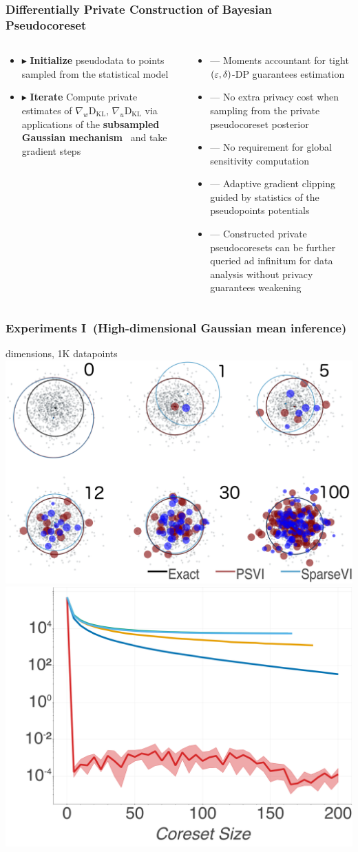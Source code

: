 \documentclass[hyperref={colorlinks = true},unknownkeysallowed]{beamer}
\let\oldcitep=\citep
\renewcommand\citep[1]{\hypersetup{linkcolor=UBCblue}\hyperlink{#1}{\oldcitep{#1}}}
\begin{document}
\begin{frame}
	\frametitle{Differentially Private Construction of Bayesian Pseudocoreset}
	\vspace{-0.7cm}
	\begin{columns}
		\begin{column}[t]{0.4\textwidth}
		\begin{itemize}
			\item $\blacktriangleright$ \textbf{Initialize} pseudodata to points sampled from the statistical model
			\item $\blacktriangleright$ \textbf{Iterate} Compute private estimates of $\nabla_w\mathrm{D}_{\mathrm{KL}}$, $\nabla_u\mathrm{D}_{\mathrm{KL}}$ via applications of the \textbf{subsampled Gaussian mechanism}~\citep{abadi16} and take gradient steps
		\end{itemize}
		\end{column}
	\pause
		\begin{column}[t]{0.6\textwidth}
		\begin{itemize}
			\item --- Moments accountant for tight $(\varepsilon, \delta)$-DP guarantees estimation
			\item --- No extra privacy cost when sampling from the private pseudocoreset posterior
			\item --- No requirement for global sensitivity computation
			\item --- Adaptive gradient clipping guided by statistics of the pseudopoints potentials
			\item --- Constructed private pseudocoresets can be further queried ad infinitum for data analysis without privacy guarantees weakening
		\end{itemize}
		\end{column}
	\end{columns}
\end{frame}

\begin{frame}
	\frametitle{Experiments I~(High-dimensional Gaussian mean inference)}
	 dimensions, 1K datapoints\\
	\includegraphics[width=.49\textwidth]{figs/d500_pts_combined.png}
	\includegraphics[width=.49\textwidth]{figs/d500_KLDvsCstSize.png}
\end{frame}
\end{document}
